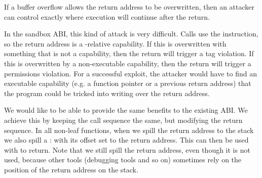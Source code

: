 If a buffer overflow allows the return address to be overwritten, then an attacker can control exactly where execution will continue after the return.

In the sandbox ABI, this kind of attack is very difficult.
Calls use the  instruction, so the return address is a -relative capability.
If this is overwritten with something that is not a capability, then the return will trigger a tag violation.
If this is overwritten by a non-executable capability, then the return will trigger a permissions violation.
For a successful exploit, the attacker would have to find an executable capability (e.g. a function pointer or a previous return address) that the program could be tricked into writing over the return address.

We would like to be able to provide the same benefits to the existing ABI.
We achieve this by keeping the call sequence the same, but modifying the return sequence.
In all non-leaf functions, when we spill the return address to the stack we also spill a :  with its offset set to the return address.
This can then be used with  to return.
Note that we still spill the return address, even though it is not used, because other tools (debugging tools and so on) sometimes rely on the position of the return address on the stack.
